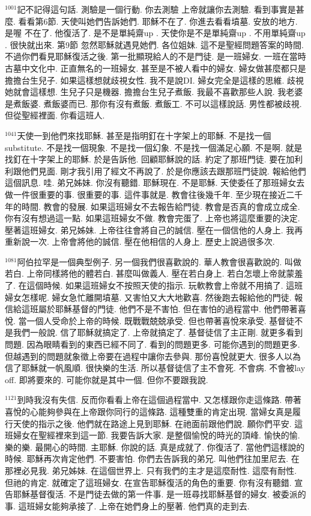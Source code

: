 \documentclass{book}
\begin{document}
$^{1001}$記不記得這句話.
測驗是一個行動.
你去測驗 上帝就讓你去測驗.
看到事實是甚麼.
看看第6節.
天使叫她們告訴她們.
耶穌不在了.
你進去看看墳墓.
安放的地方.
是喔 不在了.
他復活了.
是不是單純齋up .
天使你是不是單純齋up .
不用單純齋up .
很快就出來.
第9節 忽然耶穌就遇見她們.
各位姐妹.
這不是聖經問題答案的時間.
不過你們看見耶穌復活之後.
第一批顯現給人的不是門徒.
是一班婦女.
一班在當時古墓中文化中.
正直無名的一班婦女.
甚至是不被人看中的婦女.
婦女做甚麼都只是擔擔台生兒子.
如果這樣想就歧視女性.
我不是說DI.
婦女完全是這樣的思維.
歧視她就會這樣想.
生兒子只是機器.
擔擔台生兒子煮飯.
我最不喜歡那些人說.
我老婆是煮飯婆.
煮飯婆而已.
那你有沒有煮飯.
煮飯工.
不可以這樣說話.
男性都被歧視.
但從聖經裡面.
你看這班人.

$^{1041}$天使一到他們來找耶穌.
甚至是指明釘在十字架上的耶穌.
不是找一個substitute.
不是找一個現象.
不是找一個幻象.
不是找一個滿足心願.
不是啊.
就是找釘在十字架上的耶穌.
於是告訴他.
回顧耶穌說的話.
約定了那班門徒.
要在加利利跟他們見面.
剛才我引用了經文不再說了.
於是你應該去跟那班門徒說.
報給他們這個訊息.
哇.
弟兄姊妹.
你沒有聽錯.
耶穌現在.
不是耶穌.
天使委任了那班婦女去做一件很重要的事.
很重要的事.
這件事就是.
教會往後幾千年.
至少現在接近二千年的時間.
教會的發展.
如果這班婦女不去報告給門徒.
教會是否真的會成立成全.
你有沒有想過這一點.
如果這班婦女不做.
教會完蛋了.
上帝也將這麼重要的決定.
壓著這班婦女.
弟兄姊妹.
上帝往往會將自己的誠信.
壓在一個信他的人身上.
我再重新說一次.
上帝會將他的誠信.
壓在他相信的人身上.
歷史上說過很多次.

$^{1081}$阿伯拉罕是一個典型例子.
另一個我們很喜歡說的.
華人教會很喜歡說的.
叫做若白.
上帝同樣將他的體若白.
甚麼叫做義人.
壓在若白身上.
若白怎壞上帝就蒙羞了.
在這個時候.
如果這班婦女不按照天使的指示.
玩軟教會上帝就不用搞了.
這班婦女怎樣呢.
婦女急忙離開墳墓.
又害怕又大大地歡喜.
然後跑去報給他的門徒.
報信給這班屬於耶穌基督的門徒.
他們不是不害怕.
但在害怕的過程當中.
他們帶著喜悅.
當一個人受命於上帝的時候.
既戰戰兢兢承受.
但也帶著喜悅來承受.
基督徒不是我們一般說.
信了耶穌就搞定了.
上帝就搞定了.
基督徒信了主正剛.
就更多看到問題.
因為眼睛看到的東西已經不同了.
看到的問題更多.
可能你遇到的問題更多.
但越遇到的問題就象徵上帝要在過程中讓你去參與.
那份喜悅就更大.
很多人以為信了耶穌就一帆風順.
很快樂的生活.
所以基督徒信了主不會死.
不會病.
不會被lay off.
即將要來的.
可能你就是其中一個.
但你不要跟我說.

$^{1121}$到時我沒有失信.
反而你看看上帝在這個過程當中.
又怎樣跟你走這條路.
帶著喜悅的心能夠參與在上帝跟你同行的這條路.
這種雙重的肯定出現.
當婦女真是履行天使的指示之後.
他們就在路途上見到耶穌.
在祂面前跟他們說.
願你們平安.
這班婦女在聖經裡來到這一節.
我要告訴大家.
是整個愉悅的時光的頂峰.
愉快的愉.
樂的樂.
最開心的時間.
主耶穌.
你說的話.
真是成就了.
你復活了.
當他們這樣說的時候.
耶穌再次肯定他們.
不要害怕.
你們去告訴我的弟兄.
叫他們往加里尼去.
在那裡必見我.
弟兄姊妹.
在這個世界上.
只有我們的主才是這麼耐性.
這麼有耐性.
但祂的肯定.
就確定了這班婦女.
在宣告耶穌復活的角色的重要.
你有沒有聽錯.
宣告耶穌基督復活.
不是門徒去做的第一件事.
是一班尋找耶穌基督的婦女.
被委派的事.
這班婦女能夠承接了.
上帝在她們身上的壓著.
他們真的走到去.
\end{document}

